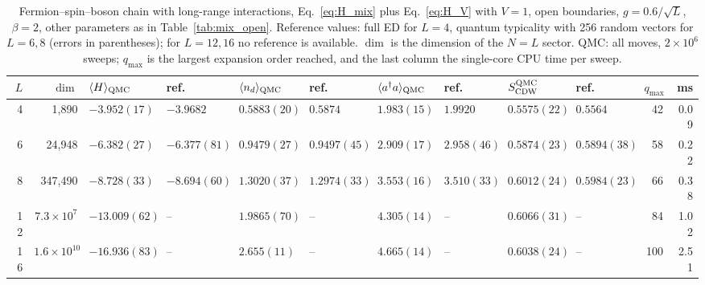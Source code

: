 \begin{table}[t]
\caption{Fermion--spin--boson chain with long-range interactions, Eq.~\eqref{eq:H_mix} plus Eq.~\eqref{eq:H_V} with $V=1$, open boundaries, $g=0.6/\sqrt L$, $\beta=2$, other parameters as in Table~\ref{tab:mix_open}. Reference values: full ED for $L=4$, quantum typicality with 256 random vectors for $L=6,8$ (errors in parentheses); for $L=12,16$ no reference is available. $\dim$ is the dimension of the $N=L$ sector. QMC: all moves, $2\times10^6$ sweeps; $q_{\max}$ is the largest expansion order reached, and the last column the single-core CPU time per sweep.}
\label{tab:lr}
\small
\begin{tabular}{r r|ll|ll|ll|ll|r|r}
\hline\hline
$L$ & $\dim$ & $\langle H\rangle_{\rm QMC}$ & ref. & $\langle n_d\rangle_{\rm QMC}$ & ref. & $\langle a^\dagger a\rangle_{\rm QMC}$ & ref. & $S_{\rm CDW}^{\rm QMC}$ & ref. & $q_{\max}$ & ms\\
\hline
4 & 1{,}890 & $-3.952(17)$ & $-3.9682$ & $0.5883(20)$ & $0.5874$ & $1.983(15)$ & $1.9920$ & $0.5575(22)$ & $0.5564$ & 42 & 0.09 \\
6 & 24{,}948 & $-6.382(27)$ & $-6.377(81)$ & $0.9479(27)$ & $0.9497(45)$ & $2.909(17)$ & $2.958(46)$ & $0.5874(23)$ & $0.5894(38)$ & 58 & 0.22 \\
8 & 347{,}490 & $-8.728(33)$ & $-8.694(60)$ & $1.3020(37)$ & $1.2974(33)$ & $3.553(16)$ & $3.510(33)$ & $0.6012(24)$ & $0.5984(23)$ & 66 & 0.38 \\
12 & $7.3\times10^{7}$ & $-13.009(62)$ & -- & $1.9865(70)$ & -- & $4.305(14)$ & -- & $0.6066(31)$ & -- & 84 & 1.02 \\
16 & $1.6\times10^{10}$ & $-16.936(83)$ & -- & $2.655(11)$ & -- & $4.665(14)$ & -- & $0.6038(24)$ & -- & 100 & 2.51 \\
\hline\hline
\end{tabular}
\end{table}

